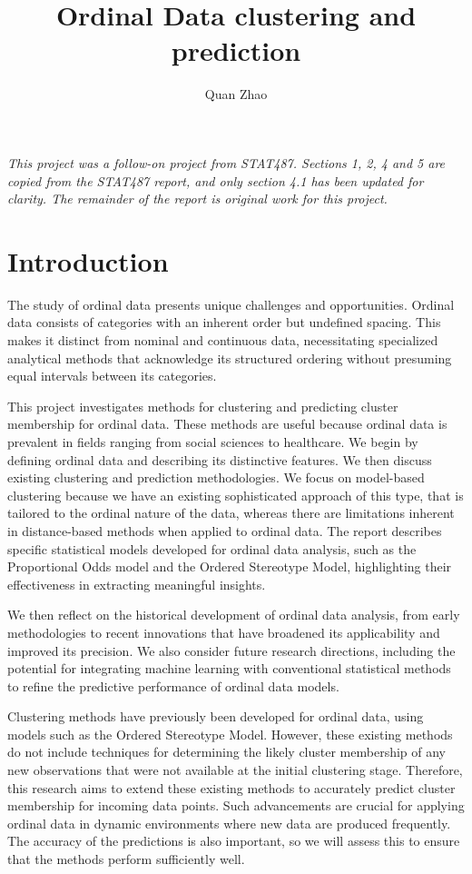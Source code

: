 \documentclass{article}
\begin{document}
\title{Ordinal Data clustering and prediction}

\author{Quan Zhao}

\maketitle

\textit{This project was a follow-on project from STAT487. Sections 1, 2, 4 and 5 are copied from the STAT487 report, and only section 4.1 has been updated for clarity. The remainder of the report is original work for this project.}

\section{Introduction}


The study of ordinal data presents unique challenges and opportunities.
Ordinal data consists of categories with an inherent order but undefined
spacing. This makes it distinct from nominal and continuous data,
necessitating specialized analytical methods that acknowledge its
structured ordering without presuming equal intervals between its
categories.

This project investigates methods for clustering and predicting cluster
membership for ordinal data. These methods are useful because ordinal
data is prevalent in fields ranging from social sciences to healthcare.
We begin by defining ordinal data and describing its distinctive
features. We then discuss existing clustering and prediction
methodologies. We focus on model-based clustering because we have an
existing sophisticated approach of this type, that is tailored to the
ordinal nature of the data, whereas there are limitations inherent in
distance-based methods when applied to ordinal data. The report
describes specific statistical models developed for ordinal data
analysis, such as the Proportional Odds model and the Ordered Stereotype
Model, highlighting their effectiveness in extracting meaningful
insights.

We then reflect on the historical development of ordinal data analysis,
from early methodologies to recent innovations that have broadened its
applicability and improved its precision. We also consider future
research directions, including the potential for integrating machine
learning with conventional statistical methods to refine the predictive
performance of ordinal data models.

Clustering methods have previously been developed for ordinal data,
using models such as the Ordered Stereotype Model. However, these
existing methods do not include techniques for determining the likely
cluster membership of any new observations that were not available at
the initial clustering stage. Therefore, this research aims to extend
these existing methods to accurately predict cluster membership for
incoming data points. Such advancements are crucial for applying ordinal
data in dynamic environments where new data are produced frequently. The
accuracy of the predictions is also important, so we will assess this to
ensure that the methods perform sufficiently well.
\end{document}
